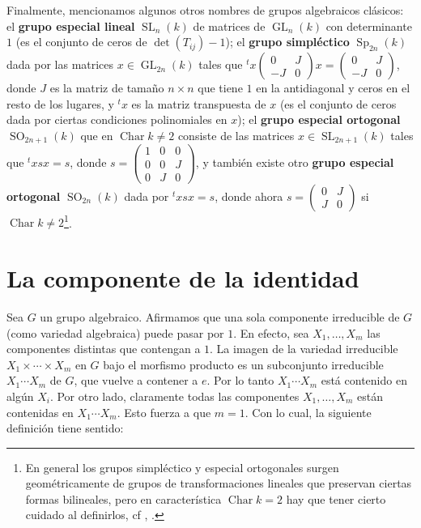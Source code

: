 \documentclass[spanish,10pt]{amsart}
\theoremstyle{definition}
\theoremstyle{remark}
\numberwithin{equation}{section}
\newcommand{\Char}[1]{\operatorname{Char} #1}
\begin{document}
Finalmente, mencionamos algunos otros nombres de grupos algebraicos clásicos: el \textbf{grupo especial lineal} $\operatorname{SL}_n (k)$ de matrices de $\operatorname{GL}_n (k)$ con determinante $1$ (es el conjunto de ceros de $\det (T_{ij}) - 1$); el \textbf{grupo simpléctico} $\operatorname{Sp}_{2n} (k)$ dada por las matrices $x \in \operatorname{GL}_{2n} (k)$ tales que ${}^t x \begin{pmatrix} 0 & J \\ - J & 0 \end{pmatrix} x = \begin{pmatrix} 0 & J \\ - J & 0 \end{pmatrix}$, donde $J$ es la matriz de tamaño $n \times n$ que tiene $1$ en la antidiagonal y ceros en el resto de los lugares, y ${}^t x$ es la matriz transpuesta de $x$ (es el conjunto de ceros dada por ciertas condiciones polinomiales en $x$); el \textbf{grupo especial ortogonal} $\operatorname{SO}_{2n + 1} (k)$ que en $\Char k \neq 2$ consiste de las matrices $x \in \operatorname{SL}_{2n+1} (k)$ tales que ${}^t x s x = s$, donde $s = \begin{pmatrix} 1 & 0 & 0 \\ 0 & 0 & J \\ 0 & J & 0 \end{pmatrix}$, y también existe otro \textbf{grupo especial ortogonal} $\operatorname{SO}_{2n} (k)$ dada por ${}^t x s x = s$, donde ahora $s = \begin{pmatrix} 0 & J \\ J & 0 \end{pmatrix}$ si $\Char k \neq 2$\footnote{En general los grupos simpléctico y especial ortogonales surgen geométricamente de grupos de transformaciones lineales que preservan ciertas formas bilineales, pero en característica $\Char k = 2$ hay que tener cierto cuidado al definirlos, cf \cite{dieudonne1956groupesDeLieEtHyperalgebresDeLieSurUnCorpsDeCaracteristiqueP}, \cite[Ch. 1]{carter1989simpleGroupsOfLieType}.}.




\section{La componente de la identidad}

Sea $G$ un grupo algebraico. Afirmamos que una sola componente irreducible de $G$ (como variedad algebraica) puede pasar por $1$. En efecto, sea $X_1, \ldots, X_m$ las componentes distintas que contengan a $1$. La imagen de la variedad irreducible $X_1 \times \cdots \times X_m$ en $G$ bajo el morfismo producto es un subconjunto irreducible $X_1 \cdots X_m$ de $G$, que vuelve a contener a $e$. Por lo tanto $X_1 \cdots X_m$ está contenido en algún $X_i$. Por otro lado, claramente todas las componentes $X_1, \ldots, X_m$ están contenidas en $X_1 \cdots X_m$. Esto fuerza a que $m = 1$. Con lo cual, la siguiente definición tiene sentido:
\end{document}
